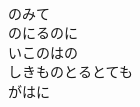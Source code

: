 \documentclass[10pt,b5j]{tarticle} %
\begin{document}
\begin{enumerate}
\begin{minipage}[c]{\blocksize}
    \end{minipage}
    \begin{minipage}[c]{\blocksize}
        
        \vspace{\linespace}
        \item~\\
        のみて\\
        のにるのに\\
        いこのはの\\
        しきものとるとても\\
        がはに
    
    \end{minipage}
\end{enumerate} %
\end{document}

